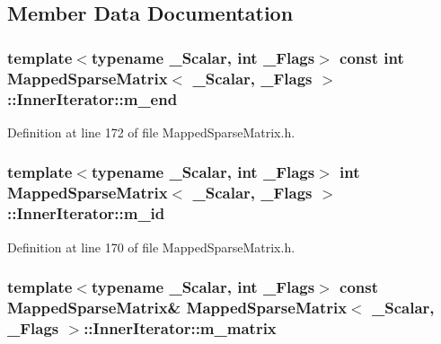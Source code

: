 \subsection{Member Data Documentation}
\hypertarget{class_mapped_sparse_matrix_1_1_inner_iterator_a7d907189dc2dd590c52733de2cea6252}{
\subsubsection[{m\-\_\-end}]{\setlength{\rightskip}{0pt plus 5cm}template$<$typename \-\_\-\-Scalar, int \-\_\-\-Flags$>$ const {\bf int} {\bf Mapped\-Sparse\-Matrix}$<$ \-\_\-\-Scalar, \-\_\-\-Flags $>$\-::Inner\-Iterator\-::m\-\_\-end\hspace{0.3cm}{\ttfamily [protected]}}}\label{class_mapped_sparse_matrix_1_1_inner_iterator_a7d907189dc2dd590c52733de2cea6252}


Definition at line 172 of file Mapped\-Sparse\-Matrix.\-h.

\hypertarget{class_mapped_sparse_matrix_1_1_inner_iterator_aa0525d021c270d8f6cf867028b0699ce}{
\subsubsection[{m\-\_\-id}]{\setlength{\rightskip}{0pt plus 5cm}template$<$typename \-\_\-\-Scalar, int \-\_\-\-Flags$>$ {\bf int} {\bf Mapped\-Sparse\-Matrix}$<$ \-\_\-\-Scalar, \-\_\-\-Flags $>$\-::Inner\-Iterator\-::m\-\_\-id\hspace{0.3cm}{\ttfamily [protected]}}}\label{class_mapped_sparse_matrix_1_1_inner_iterator_aa0525d021c270d8f6cf867028b0699ce}


Definition at line 170 of file Mapped\-Sparse\-Matrix.\-h.

\hypertarget{class_mapped_sparse_matrix_1_1_inner_iterator_a4b68f0f4484a05012906f8e728c4ce69}{
\subsubsection[{m\-\_\-matrix}]{\setlength{\rightskip}{0pt plus 5cm}template$<$typename \-\_\-\-Scalar, int \-\_\-\-Flags$>$ const {\bf Mapped\-Sparse\-Matrix}\& {\bf Mapped\-Sparse\-Matrix}$<$ \-\_\-\-Scalar, \-\_\-\-Flags $>$\-::Inner\-Iterator\-::m\-\_\-matrix\hspace{0.3cm}{\ttfamily [protected]}}}\label{class_mapped_sparse_matrix_1_1_inner_iterator_a4b68f0f4484a05012906f8e728c4ce69}


